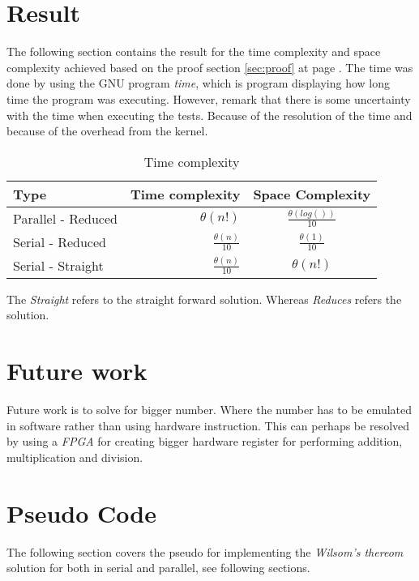 \documentclass[12pt, oneside, onecolumn]{article}
\begin{document}
\section{Result}
The following section contains the result for the time complexity and space complexity achieved based on the proof section \ref{sec:proof} at page \pageref{sec:proof}. The time was done by using the GNU program \textit{time}, which is program displaying how long time the program was executing.
However, remark that there is some uncertainty with the time when executing the tests. Because of the resolution of the time and because of the overhead from the kernel.

\begin{table}[!h]
\centering
\begin{tabular}{ | l | r | c | }
\hline
Type & Time complexity  & Space Complexity				 						\\ \hline
Parallel - Reduced 	& $\theta(n!)$ 				& $\frac{\theta(log())}{10}$  	\\ \hline
Serial - Reduced 	& $\frac{\theta(n)}{10}$ 	& $\frac{\theta(1)}{10}$ 		\\ \hline
Serial - Straight 	& $\frac{\theta(n)}{10}$ 	& $\theta(n!)$ 					\\ \hline
\end{tabular}
\caption{Time complexity}
\label{tab:res}
\end{table}
The \emph{Straight} refers to the straight forward solution. Whereas \emph{Reduces} refers the solution.

%

%
\section{Future work}
Future work is to solve for bigger number. Where the number has to be emulated in software rather than using hardware instruction. This can perhaps be resolved by using a
\textit{FPGA} for creating bigger hardware register for performing addition, multiplication and division.

\section{Pseudo Code}
The following section covers the pseudo for implementing the \emph{Wilsom's thereom} solution for both in serial and parallel, see following sections.
\end{document}
